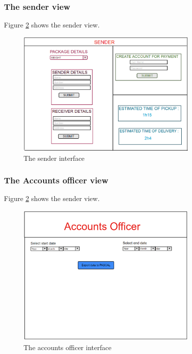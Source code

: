 \documentclass[paper=a4, fontsize=11pt]{scrartcl} %
\numberwithin{equation}{section} %
\numberwithin{figure}{section} %
\numberwithin{table}{section} %
\begin{document}
\subsubsection{The sender view}
Figure \ref{Sender} shows the sender view.
\begin{figure}[h!]
\centering
\includegraphics[width=3.5in]{pictures/sender.png}
\caption{The sender interface}
\label{Sender}
\end{figure}

\subsubsection{The Accounts officer view}
Figure \ref{Sender} shows the sender view.
\begin{figure}[h!]
\centering
\includegraphics[width=3.5in]{pictures/accounts.png}
\caption{The accounts officer interface}
\label{Sender}
\end{figure}
\end{document}
